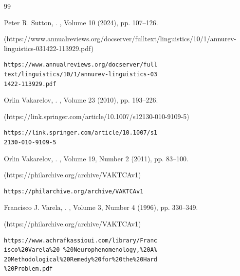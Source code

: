 \begin{thebibliography}{99}
{
Peter R. Sutton,
.
, 
Volume 10 (2024), pp. 107--126.
%
\begin{boxurl}(https://www.annualreviews.org/docserver/fulltext/linguistics/10/1/annurev-linguistics-031422-113929.pdf)
\begin{lstlisting}
https://www.annualreviews.org/docserver/full
text/linguistics/10/1/annurev-linguistics-03
1422-113929.pdf
\end{lstlisting}
\end{boxurl}




Orlin Vakarelov,
.
, 
Volume 23 (2010), pp. 193--226.
%
\begin{boxurl}(https://link.springer.com/article/10.1007/s12130-010-9109-5)
\begin{lstlisting}
https://link.springer.com/article/10.1007/s1
2130-010-9109-5
\end{lstlisting}
\end{boxurl}






Orlin Vakarelov, 
.
,
Volume 19, Number 2 (2011), pp. 83--100.
%
\begin{boxurl}(https://philarchive.org/archive/VAKTCAv1)
\begin{lstlisting}
https://philarchive.org/archive/VAKTCAv1
\end{lstlisting}
\end{boxurl}




Francisco J. Varela, 
.
,
Volume 3, Number 4 (1996), pp. 330--349.
%
\begin{boxurl}(https://philarchive.org/archive/VAKTCAv1)
\begin{lstlisting}
https://www.achrafkassioui.com/library/Franc
isco%20Varela%20-%20Neurophenomenology,%20A%
20Methodological%20Remedy%20for%20the%20Hard
%20Problem.pdf
\end{lstlisting}
\end{boxurl}



}
\end{thebibliography}
